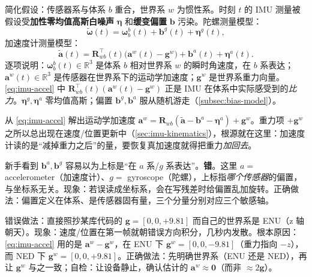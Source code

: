 简化假设：传感器系与体系 $b$ 重合，世界系 $w$ 为惯性系。时刻 $t$ 的 IMU 测量被假设受\textbf{加性零均值高斯白噪声} $\boldsymbol\eta$ 和\textbf{缓变偏置} $\mathbf b$ 污染。陀螺测量模型\cite{forster2017preintegration,carlone2026handbook}：
\begin{equation}
  \tilde{\boldsymbol\omega}(t)=\boldsymbol\omega_b^b(t)+\mathbf b^g(t)+\boldsymbol\eta^g(t),
  \label{eq:imu-gyro}
\end{equation}
加速度计测量模型：
\begin{equation}
  \tilde{\mathbf a}(t)=\mathbf R_{wb}^\top(t)\big(\mathbf a^w(t)-\mathbf g^w\big)+\mathbf b^a(t)+\boldsymbol\eta^a(t).
  \label{eq:imu-accel}
\end{equation}
逐项说明：$\boldsymbol\omega_b^b(t)\in\mathbb R^3$ 是体系 $b$ 相对世界系 $w$ 的瞬时角速度，在 $b$ 系表达；$\mathbf a^w(t)\in\mathbb R^3$ 是传感器在世界系下的运动学加速度；$\mathbf g^w$ 是世界系重力向量。\cref{eq:imu-accel} 中 $\mathbf R_{wb}^\top(t)(\mathbf a^w(t)-\mathbf g^w)$ 正是 IMU 在体系中实际感受到的\emph{比力}。$\boldsymbol\eta^g,\boldsymbol\eta^a$ 零均值高斯；偏置 $\mathbf b^g,\mathbf b^a$ 服从随机游走（\cref{subsec:bias-model}）。

\begin{insight}\label{ins:specific-force}
从 \cref{eq:imu-accel} 解出运动学加速度 $\mathbf a^w=\mathbf R_{wb}(\tilde{\mathbf a}-\mathbf b^a-\boldsymbol\eta^a)+\mathbf g^w$。重力项 $+\mathbf g^w$ 之所以总出现在速度/位置更新中（\cref{sec:imu-kinematics}），根源就在这里：加速度计读的是“减掉重力之后”的量，要恢复真加速度就得把重力\emph{加回去}。
\end{insight}

\begin{pitfall}
新手看到 $\mathbf b^a,\mathbf b^g$ 容易以为上标是“在 $a$ 系/$g$ 系表达”。\textbf{错}。这里 $a=$ accelerometer（加速度计）、$g=$ gyroscope（陀螺），上标指\emph{哪个传感器}的偏置，与坐标系无关。现象：若误读成坐标系，会在写残差时给偏置乱加旋转。正确做法：偏置定义在体系、是传感器固有量，三个分量分别对应三个敏感轴。\cite{carlone2026handbook}
\end{pitfall}

\begin{pitfall}
错误做法：直接照抄某库代码的 $\mathbf g=[0,0,+9.81]$ 而自己的世界系是 ENU（z 轴朝天）。现象：速度/位置在第一帧就朝错误方向积分，几秒内发散。根本原因：\cref{eq:imu-accel} 用的是 $\mathbf a^w-\mathbf g^w$，在 ENU 下 $\mathbf g^w=[0,0,-9.81]$（重力指向 $-z$），而 NED 下 $\mathbf g^w=[0,0,+9.81]$。正确做法：先明确世界系（ENU 还是 NED），再让 $\mathbf g^w$ 与之一致；自检：让设备静止，确认估计的 $\mathbf a^w\approx\mathbf 0$（而非 $\approx2\mathbf g$）。
\end{pitfall}


